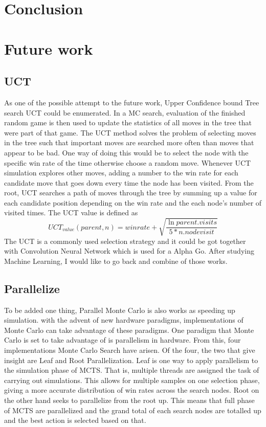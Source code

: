 \documentclass[12pt]{article}
\begin{document}
\section{Conclusion}

\section{Future work}
\subsection{UCT}
As one of the possible attempt to the future work, Upper Confidence bound Tree search UCT could be enumerated\cite{kocsis2006bandit}.  In a MC search, evaluation of the finished random game is then used to update the statistics of all moves in the tree that were part of that game. The UCT method solves the problem of selecting moves in the tree such that important moves are searched more often than moves that appear to be bad. One way of doing this would be to select the node with the specific win rate of the time otherwise choose a random move. Whenever UCT simulation explores other moves,  adding a number to the win rate for each candidate move that goes down every time the node has been visited. From the root, UCT searches a path of moves through the tree by summing up a value for each candidate position depending on the win rate and the each node’s number of visited times. The UCT value is defined as 
\[UCT_{value}(parent, n) = winrate + \sqrt{\frac{\ln{parent.visits}}{5*n.nodevisit}}\]
The UCT is a commonly used selection strategy and it could be got together with Convolution Neural Network which is used for a Alpha Go\cite{silver2016mastering}. After studying Machine Learning, I would like to go back and combine of those works. 
\subsection{Parallelize}
To be added one thing, Parallel Monte Carlo is also works as speeding up simulation. with the advent of new hardware paradigms, implementations of Monte Carlo can take advantage of these paradigms. One paradigm that Monte Carlo is set to take advantage of is parallelism in hardware. From this, four implementations Monte Carlo Search have arisen. Of the four, the two that give insight are Leaf and Root Parallelization.\cite{chaslot2008parallel} Leaf is one way to apply parallelism to the simulation phase of MCTS. That is, multiple threads are assigned the task of carrying out simulations. This allows for multiple samples on one selection phase, giving a more accurate distribution of win rates across the search nodes. Root on the other hand seeks to parallelize from the root up. This means that full phase of MCTS are parallelized and the grand total of each search nodes are totalled up and the best action is selected based on that. 


\end{document}
